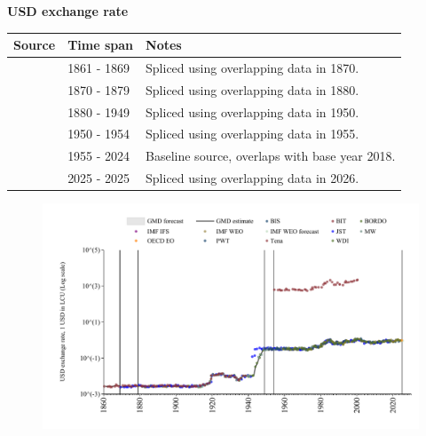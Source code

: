 \documentclass[12pt,a4paper,landscape]{article}
\begin{document}
\begin{adjustbox}{max totalsize={\paperwidth}{\paperheight},center}
\begin{minipage}[t][\textheight][t]{\textwidth}
\vspace*{0.5cm}
{}
\begin{center}
{\Large\bfseries USD exchange rate}
\end{center}
\vspace{0.5cm}
\begin{table}[H]
\centering
\small
\begin{tabular}{|l|l|l|}
\hline
\textbf{Source} & \textbf{Time span} & \textbf{Notes} \\
\hline
\rowcolor{white}\cite{Tena}& 1861 - 1869 &Spliced using overlapping data in 1870. \\
\rowcolor{lightgray}\cite{JST}& 1870 - 1879 &Spliced using overlapping data in 1880. \\
\rowcolor{white}\cite{BORDO}& 1880 - 1949 &Spliced using overlapping data in 1950. \\
\rowcolor{lightgray}\cite{IMF_IFS}& 1950 - 1954 &Spliced using overlapping data in 1955. \\
\rowcolor{white}\cite{BIS}& 1955 - 2024 &Baseline source, overlaps with base year 2018. \\
\rowcolor{lightgray}\cite{OECD_EO}& 2025 - 2025 &Spliced using overlapping data in 2026. \\
\hline
\end{tabular}
\end{table}
\begin{figure}[H]
\centering
\includegraphics[width=\textwidth,height=0.6\textheight,keepaspectratio]{graphs/ITA_USDfx.pdf}
\end{figure}
\end{minipage}
\end{adjustbox}
\end{document}

